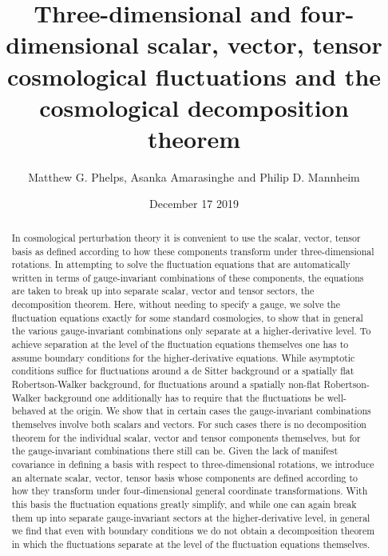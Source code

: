 \documentclass[aps,onecolumn,10pt]{revtex4}
\numberwithin{equation}{section}
\numberwithin{equation}{section}
\begin{document}
\allowdisplaybreaks
\setcounter{equation}{0}

 
\title{Three-dimensional and four-dimensional scalar, vector, tensor cosmological fluctuations and the cosmological decomposition theorem}

\author{Matthew G. Phelps, Asanka Amarasinghe  and Philip D. Mannheim}

\date{December 17 2019}

\begin{abstract}


In cosmological perturbation theory it is convenient to use the scalar, vector, tensor  basis as defined according to how these components transform under three-dimensional rotations. In attempting to solve the fluctuation equations that are automatically written in terms of gauge-invariant combinations of these components, the equations are taken to break up into separate scalar, vector and tensor sectors, the decomposition theorem. Here, without needing to specify a gauge, we solve the fluctuation equations exactly for some standard cosmologies, to show that in general the various gauge-invariant combinations only separate at a higher-derivative level. To achieve separation at the level of the fluctuation equations themselves one has to assume boundary conditions for the higher-derivative equations. While asymptotic conditions suffice for fluctuations around a de Sitter background or a spatially flat Robertson-Walker background, for fluctuations around a spatially non-flat Robertson-Walker background one additionally has to require that the fluctuations be well-behaved at the origin. We show that in certain cases the gauge-invariant combinations themselves involve both scalars and vectors. For such cases there is no decomposition theorem for the individual scalar, vector and tensor components  themselves, but for the gauge-invariant combinations there still can be. Given the lack of manifest covariance in defining a basis with respect to three-dimensional rotations, we introduce an alternate scalar, vector, tensor basis whose components are defined according to how they transform under four-dimensional general coordinate transformations. With this basis the fluctuation equations greatly simplify, and while one can again break them up into separate gauge-invariant sectors at the higher-derivative level, in general we find that even with boundary conditions we do not obtain a decomposition theorem in which the fluctuations separate at the level of the fluctuation equations themselves. 



\end{abstract}
\end{document}
